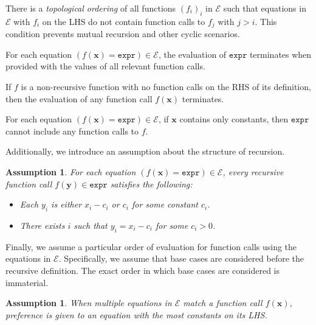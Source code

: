 \documentclass[a4paper,UKenglish,cleveref, autoref, thm-restate]{lipics-v2021}
\newcommand{\expr}{\mathtt{expr}}
\newtheorem{assumption}[theorem]{Assumption}
\begin{document}
\begin{observation}\label{assumption2}
  There is a \emph{topological ordering} of all functions ${(f_{i})}_{i}$ in
  $\mathcal{E}$ such that equations in $\mathcal{E}$ with $f_{i}$ on the LHS do
  not contain function calls to $f_{j}$ with $j > i$. This condition prevents
  mutual recursion and other cyclic scenarios.
\end{observation}

\begin{observation}\label{assumption3}
  For each equation $(f(\mathbf{x}) = \expr) \in \mathcal{E}$, the evaluation
  of $\expr$ terminates when provided with the values of all relevant function
  calls.
\end{observation}

\begin{corollary}\label{fact}
  If $f$ is a non-recursive function with no function calls on the RHS of its
  definition, then the evaluation of any function call $f(\mathbf{x})$
  terminates.
\end{corollary}

\begin{observation}\label{fact2}
  For each equation $(f(\mathbf{x}) = \expr{}) \in \mathcal{E}$, if $\mathbf{x}$
  contains only constants, then $\expr{}$ cannot include any function calls to
  $f$.
\end{observation}

Additionally, we introduce an assumption about the structure of recursion.

\begin{assumption}\label{assumption4}
  For each equation $(f(\mathbf{x}) = \expr) \in \mathcal{E}$, every recursive
  function call $f(\mathbf{y}) \in \expr$ satisfies the following:
  \begin{itemize}
    \item Each $y_{i}$ is either $x_{i} - c_{i}$ or $c_{i}$ for some constant
          $c_{i}$.
    \item There exists $i$ such that $y_{i} = x_{i} - c_{i}$ for some
          $c_{i} > 0$.
  \end{itemize}
\end{assumption}

Finally, we assume a particular order of evaluation for function calls using the
equations in $\mathcal{E}$. Specifically, we assume that base cases are
considered before the recursive definition. The exact order in which base cases
are considered is immaterial.

\begin{assumption}
  When multiple equations in $\mathcal{E}$ match a function call
  $f(\mathbf{x})$, preference is given to an equation with the most constants on
  its LHS.
\end{assumption}
\end{document}
